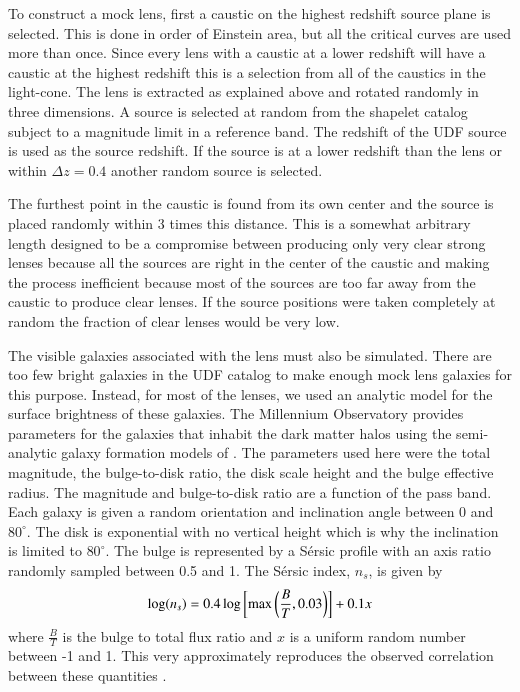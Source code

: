 \documentclass{aa}
\newcommand{\degree}{^{\circ}}
\begin{document}
To construct a mock lens, first a caustic on the highest redshift source plane is selected.  This is done in order of Einstein area, but all the critical curves are used more than once.  Since every lens with a caustic at a lower redshift will have a caustic at the highest redshift this is a selection from all of the caustics in the light-cone.   The lens is extracted as explained above and rotated randomly in three dimensions.  A source is selected at random from the shapelet catalog subject to a magnitude limit in a reference band.   The redshift of the UDF source is used as the source redshift.  If the source is at a lower redshift than the lens or within $\Delta z = 0.4$ another random source is selected.

The furthest point in the caustic is found from its own center and the source is placed randomly within 3 times this distance.  This is a somewhat arbitrary length designed to be a compromise between producing only very clear strong lenses because all the sources are right in the center of the caustic and making the process inefficient because most of the sources are too far away from the caustic to produce clear lenses.  If the source positions were taken completely at random the fraction of clear lenses would be very low.

The visible galaxies associated with the lens must also be simulated. There  are too few bright galaxies in the UDF catalog  to make enough mock lens galaxies for this purpose.  Instead, for most of the lenses, we used an analytic model for the surface brightness of these galaxies.  The Millennium Observatory provides parameters for the galaxies that inhabit the dark matter halos using the semi-analytic galaxy formation models of \citet{2011MNRAS.413..101G}.  The parameters used here were the total magnitude, the bulge-to-disk ratio, the disk scale height and the bulge effective radius.  The magnitude and bulge-to-disk ratio are a function of the pass band.  Each galaxy is given a random orientation and inclination angle between 0 and $80\degree$.  The disk is exponential with no vertical height which is why the inclination is limited to $80\degree$.  The bulge is represented by a S\'{e}rsic profile with an axis ratio randomly sampled between 0.5 and 1.  The S\'{e}rsic index, $n_s$, is given by 
\begin{align}
\log( n_s )= 0.4 \log\left[ {\rm max}\left(\frac{B}{T},0.03\right)\right] + 0.1 x 
\end{align}
where $\frac{B}{T}$ is the bulge to total flux ratio and $x$ is a uniform random number between -1 and 1.  This very approximately reproduces the observed correlation between these quantities \citep{2001AJ...121..820G}. 
\end{document}
